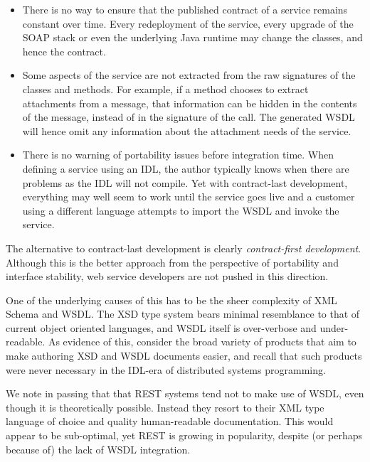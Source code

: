 \begin{itemize}

\item
    
There is no way to ensure that the published contract of a service
remains constant over time. Every redeployment of the service, every
upgrade of the SOAP stack or even the underlying Java runtime may
change the classes, and hence the contract.

\item

Some aspects of the service are not extracted from the raw signatures
of the classes and methods. For example, if a method chooses to
extract attachments from a message, that information can be hidden in
the contents of the message, instead of in the signature of the
call. The generated WSDL will hence omit any information about the
attachment needs of the service.

\item

There is no warning of portability issues before integration time.
When defining a service using an IDL, the author typically knows when
there are problems as the IDL will not compile. Yet with contract-last
development, everything may well seem to work until the service goes
live and a customer using a different language attempts to import the
WSDL and invoke the service.
    
\end{itemize}

The alternative to contract-last development is clearly \emph{contract-first
development}. Although this is the better approach from the perspective
of portability and interface stability, web service developers are not
pushed in this direction.

One of the underlying causes of this has to be the sheer complexity of
XML Schema and WSDL. The XSD type system bears minimal resemblance to
that of current object oriented languages, and WSDL itself is
over-verbose and under-readable. As evidence of this, consider the
broad variety of products that aim to make authoring XSD and WSDL
documents easier, and recall that such products were never necessary
in the IDL-era of distributed systems programming.

We note in passing that that REST systems \cite{fielding:rest} tend not to
make use of WSDL, even though it is theoretically possible. Instead
they resort to their XML type language of choice and quality
human-readable documentation. This would appear to be sub-optimal, yet
REST is growing in popularity, despite (or perhaps because of) the
lack of WSDL integration.


